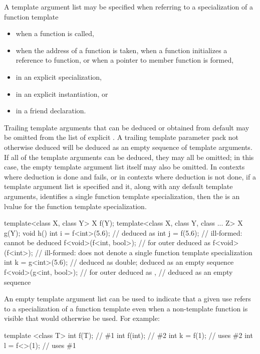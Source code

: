 \pnum
A template argument list may be specified when referring to a specialization
of a function template
\begin{itemize}
\item
when a function is called,
\item
when the address of a function is taken, when a function initializes a
reference to function, or when a pointer to member function is formed,
\item
in an explicit specialization,
\item
in an explicit instantiation, or
\item
in a friend declaration.
\end{itemize}

\pnum
Trailing template arguments that can be deduced or
obtained from default
may be omitted from the list of explicit
.
A trailing template parameter pack not otherwise deduced will be
deduced as an empty sequence of template arguments.
If all of the template arguments can be deduced, they may all be omitted;
in this case, the empty template argument list
\tcode{<>}
itself may also be omitted.
In contexts where deduction is done and fails, or in contexts where
deduction is not done, if a template argument list is specified and it,
along with any default template arguments, identifies a single function
template specialization, then the
is an lvalue for the function template specialization.
\begin{example}
\begin{codeblock}
template<class X, class Y> X f(Y);
template<class X, class Y, class ... Z> X g(Y);
void h() {
  int i = f<int>(5.6);          //  deduced as 
  int j = f(5.6);               // ill-formed:  cannot be deduced
  f<void>(f<int, bool>);        //  for outer  deduced as 
  f<void>(f<int>);              // ill-formed:  does not denote a single function template specialization
  int k = g<int>(5.6);          //  deduced as double;  deduced as an empty sequence
  f<void>(g<int, bool>);        //  for outer  deduced as ,
                                //  deduced as an empty sequence
}
\end{codeblock}
\end{example}

\pnum
\begin{note}
An empty template argument list can be used to indicate that a given
use refers to a specialization of a function template even when a
non-template function is visible that would otherwise be used.
For example:

\begin{codeblock}
template <class T> int f(T);    // \#1
int f(int);                     // \#2
int k = f(1);                   // uses \#2
int l = f<>(1);                 // uses \#1
\end{codeblock}
\end{note}

